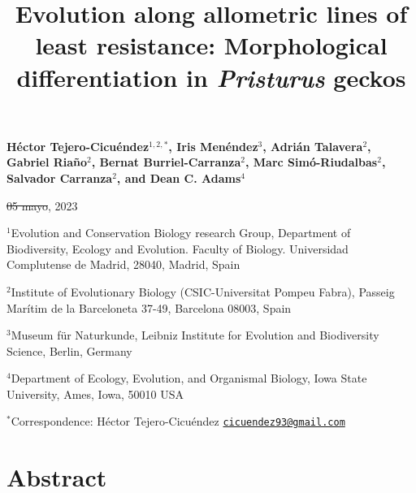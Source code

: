 \documentclass[
  11pt,
]{article}
\title{Evolution along allometric lines of least resistance:
Morphological differentiation in \emph{Pristurus} geckos}
\author{}
\date{\vspace{-2.5em}}
\providecommand{\DIFaddtex}[1]{{\protect\color{blue}\uwave{#1}}} %
\providecommand{\DIFdeltex}[1]{{\protect\color{red}\sout{#1}}}                      %
\providecommand{\DIFaddbegin}{} %
\providecommand{\DIFaddend}{} %
\providecommand{\DIFdelbegin}{} %
\providecommand{\DIFdelend}{} %
\providecommand{\DIFadd}[1]{\texorpdfstring{\DIFaddtex{#1}}{#1}} %
\providecommand{\DIFdel}[1]{\texorpdfstring{\DIFdeltex{#1}}{}} %
\newcommand{\DIFscaledelfig}{0.5}
\newlength{\DIFdelgraphicswidth} %
\newlength{\DIFdelgraphicsheight} %
\newcommand{\DIFaddincludegraphics}[2][]{{\color{blue}\fbox{\DIFOincludegraphics[#1]{#2}}}} %
\newcommand{\DIFdelincludegraphics}[2][]{%
\sbox{\DIFdelgraphicsbox}{\DIFOincludegraphics[#1]{#2}}%
\settoboxwidth{\DIFdelgraphicswidth}{\DIFdelgraphicsbox} %
\settoboxtotalheight{\DIFdelgraphicsheight}{\DIFdelgraphicsbox} %
\scalebox{\DIFscaledelfig}{%
\parbox[b]{\DIFdelgraphicswidth}{\usebox{\DIFdelgraphicsbox}\\[-\baselineskip] \rule{\DIFdelgraphicswidth}{0em}}\llap{\resizebox{\DIFdelgraphicswidth}{\DIFdelgraphicsheight}{%
\setlength{\unitlength}{\DIFdelgraphicswidth}%
\begin{picture}(1,1)%
\thicklines\linethickness{2pt} %
{\color[rgb]{1,0,0}\put(0,0){\framebox(1,1){}}}%
{\color[rgb]{1,0,0}\put(0,0){\line( 1,1){1}}}%
{\color[rgb]{1,0,0}\put(0,1){\line(1,-1){1}}}%
\end{picture}%
}\hspace*{3pt}}} %
} %
\DeclareRobustCommand{\DIFaddbegin}{\DIFOaddbegin \let\includegraphics\DIFaddincludegraphics} %
\DeclareRobustCommand{\DIFaddend}{\DIFOaddend \let\includegraphics\DIFOincludegraphics} %
\DeclareRobustCommand{\DIFdelbegin}{\DIFOdelbegin \let\includegraphics\DIFdelincludegraphics} %
\DeclareRobustCommand{\DIFdelend}{\DIFOaddend \let\includegraphics\DIFOincludegraphics} %
\begin{document}
\maketitle

\begin{center}
\textbf{H{\'{e}}ctor Tejero-Cicu{\'{e}}ndez$^{1,2,*}$,  Iris Men{\'{e}}ndez$^{3}$, Adri{\'{a}}n Talavera$^{2}$, Gabriel Riaño$^{2}$, Bernat Burriel-Carranza$^{2}$, Marc Sim{\'{o}}-Riudalbas$^{2}$, Salvador Carranza$^{2}$, and Dean C. Adams$^{4}$}
\end{center}

\begin{center}\DIFdelbegin \DIFdel{05 mayo}\DIFdelend \DIFaddbegin \DIFadd{11 August}\DIFaddend , 2023\end{center}

\(^{1}\)Evolution and Conservation Biology research Group, Department of
Biodiversity, Ecology and Evolution. Faculty of Biology. Universidad
Complutense de Madrid, 28040, Madrid, Spain

\(^{2}\)Institute of Evolutionary Biology (CSIC-Universitat Pompeu
Fabra), Passeig Marítim de la Barceloneta 37-49, Barcelona 08003, Spain

\(^{3}\)Museum für Naturkunde, Leibniz Institute for Evolution and
Biodiversity Science, Berlin, Germany

\(^{4}\)Department of Ecology, Evolution, and Organismal Biology, Iowa
State University, Ames, Iowa, 50010 USA

\(^{*}\)Correspondence: Héctor Tejero-Cicuéndez
\href{mailto:cicuendez93@gmail.com}{\nolinkurl{cicuendez93@gmail.com}}

\newpage

\hypertarget{abstract}{%
\section{Abstract}\label{abstract}}
\end{document}
